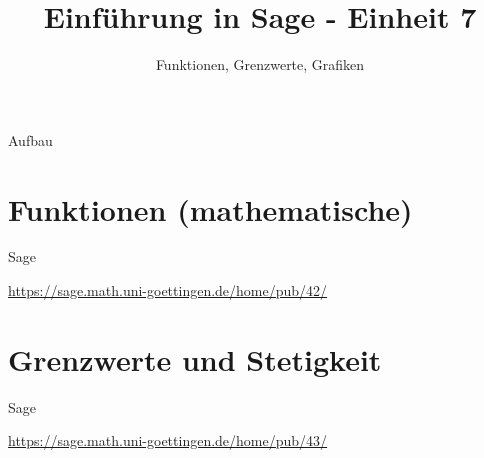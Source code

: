 \documentclass[hyperref={xetex}]{beamer}
\title{Einführung in Sage - Einheit 7}
\subtitle{Funktionen, Grenzwerte, Grafiken}
\begin{document}
\titlepage

\begin{frame}{Aufbau}
\tableofcontents
\end{frame}


\section{Funktionen (mathematische)}



\begin{frame}{Sage}
    \begin{center}
        \url{https://sage.math.uni-goettingen.de/home/pub/42/}
    \end{center}
\end{frame}



\section{Grenzwerte und Stetigkeit}



\begin{frame}{Sage}
    \begin{center}
        \url{https://sage.math.uni-goettingen.de/home/pub/43/}
    \end{center}
\end{frame}
\end{document}
